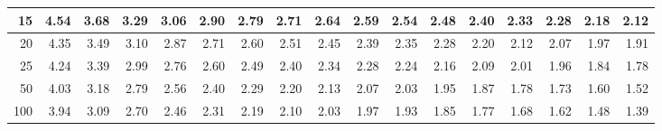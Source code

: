\begin{landscape}
\begin{tabular}{|*{17}{r|}}
\hline  15 & 4.54 & 3.68 & 3.29 & 3.06 & 2.90 & 2.79 & 2.71 & 2.64 & 2.59 & 2.54 & 2.48 & 2.40 & 2.33 & 2.28 & 2.18 & 2.12 \\ 
\hline  20 & 4.35 & 3.49 & 3.10 & 2.87 & 2.71 & 2.60 & 2.51 & 2.45 & 2.39 & 2.35 & 2.28 & 2.20 & 2.12 & 2.07 & 1.97 & 1.91 \\ 
\hline  25 & 4.24 & 3.39 & 2.99 & 2.76 & 2.60 & 2.49 & 2.40 & 2.34 & 2.28 & 2.24 & 2.16 & 2.09 & 2.01 & 1.96 & 1.84 & 1.78 \\ 
\hline  50 & 4.03 & 3.18 & 2.79 & 2.56 & 2.40 & 2.29 & 2.20 & 2.13 & 2.07 & 2.03 & 1.95 & 1.87 & 1.78 & 1.73 & 1.60 & 1.52 \\ 
\hline  100 & 3.94 & 3.09 & 2.70 & 2.46 & 2.31 & 2.19 & 2.10 & 2.03 &
1.97 & 1.93 & 1.85 & 1.77 & 1.68 & 1.62 & 1.48 & 1.39 \\ 
\hline
\end{tabular}
  

\medskip


\end{landscape}
